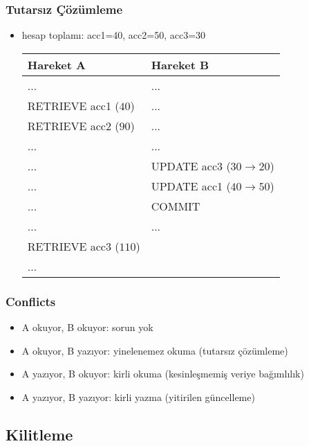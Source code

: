 \documentclass[dvipsnames]{beamer}
\theoremstyle{plain}
\begin{document}
\begin{frame}[fragile]
  \frametitle{Tutarsız Çözümleme}

  \begin{itemize}
    \item hesap toplamı: acc1=40, acc2=50, acc3=30
    \smallskip
    \begin{table}
      \begin{tabular}{ll}
Hareket A             & Hareket B                        \\\hline
...                   & ...                              \\\pause
RETRIEVE acc1 ($40$)  & ...                              \\\pause
RETRIEVE acc2 ($90$)  & ...                              \\\pause
...                   & ...                              \\
...                   & UPDATE acc3 ($30 \rightarrow 20$)\\
...                   & UPDATE acc1 ($40 \rightarrow 50$)\\
...                   & COMMIT                           \\\pause
...                   & ...                              \\
RETRIEVE acc3 ($110$) &                                  \\
...                   &
      \end{tabular}
    \end{table}
  \end{itemize}
\end{frame}

\begin{frame}
  \frametitle{Conflicts}

  \begin{itemize}
    \item A okuyor, B okuyor: sorun yok
    \item A okuyor, B yazıyor: yinelenemez okuma (tutarsız çözümleme)
    \item A yazıyor, B okuyor: kirli okuma (kesinleşmemiş veriye bağımlılık)
    \item A yazıyor, B yazıyor: kirli yazma (yitirilen güncelleme)
  \end{itemize}
\end{frame}


\subsection{Kilitleme}
\end{document}
